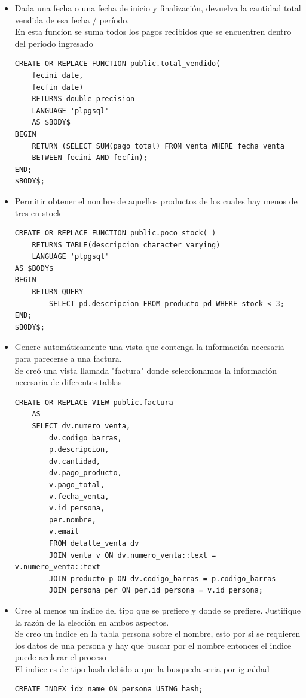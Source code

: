 \documentclass{article}
\begin{document}
\begin{itemize}
\item Dada una fecha o una fecha de inicio y finalización, devuelva la cantidad total vendida de esa fecha / período. \\

En esta funcion se suma todos los pagos recibidos que se encuentren dentro del periodo ingresado\\

\begin{lstlisting}
CREATE OR REPLACE FUNCTION public.total_vendido(
	fecini date,
	fecfin date)
	RETURNS double precision
	LANGUAGE 'plpgsql'
	AS $BODY$
BEGIN
	RETURN (SELECT SUM(pago_total) FROM venta WHERE fecha_venta 
	BETWEEN fecini AND fecfin);
END;
$BODY$;
\end{lstlisting}

\item Permitir obtener el nombre de aquellos productos de los cuales hay menos de tres en stock \\

\begin{lstlisting}
CREATE OR REPLACE FUNCTION public.poco_stock( )
	RETURNS TABLE(descripcion character varying)
	LANGUAGE 'plpgsql'
AS $BODY$
BEGIN
	RETURN QUERY
		SELECT pd.descripcion FROM producto pd WHERE stock < 3;
END;
$BODY$;
\end{lstlisting}

\item Genere automáticamente una vista que contenga la información necesaria para parecerse a una factura. \\

Se creó una vista llamada "factura" donde seleccionamos la información necesaria de diferentes tablas \\

\begin{lstlisting}
CREATE OR REPLACE VIEW public.factura
	AS
	SELECT dv.numero_venta,
		dv.codigo_barras,
		p.descripcion,
		dv.cantidad,
		dv.pago_producto,
		v.pago_total,
		v.fecha_venta,
		v.id_persona,
		per.nombre,
		v.email
		FROM detalle_venta dv
		JOIN venta v ON dv.numero_venta::text = v.numero_venta::text
		JOIN producto p ON dv.codigo_barras = p.codigo_barras
		JOIN persona per ON per.id_persona = v.id_persona;
\end{lstlisting}

\item Cree al menos un índice del tipo que se prefiere y donde se prefiere. Justifique la razón de la elección en ambos aspectos. \\

Se creo un indice en la tabla persona sobre el nombre, esto por si se requieren los datos de una persona y hay que buscar por el nombre entonces el indice puede acelerar el proceso\\

El indice es de tipo hash debido a que la busqueda seria por igualdad\\

\begin{lstlisting}
CREATE INDEX idx_name ON persona USING hash;
\end{lstlisting}
\end{itemize}
\end{document}
